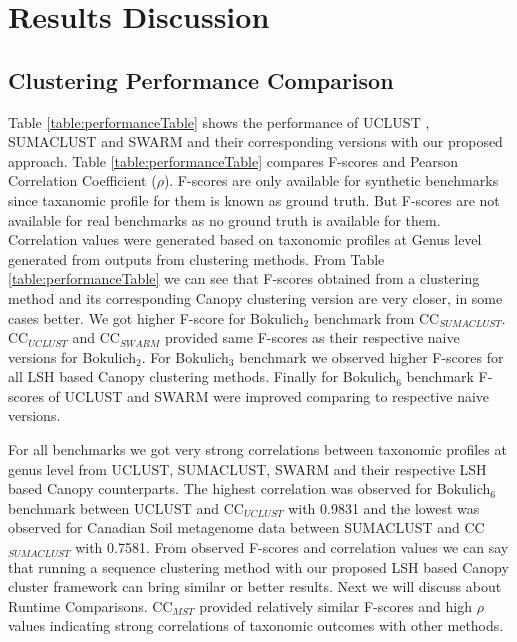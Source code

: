 \documentclass[10pt, conference, compsocconf]{IEEEtran}
\begin{document}
\section{Results Discussion} 
\label{sec:results}

\subsection{\textbf{Clustering Performance Comparison}}
Table \ref{table:performanceTable} shows the performance of  UCLUST \cite{MARuclust}, 
SUMACLUST \cite{MARSumaclust} and SWARM \cite{MARSwarm} and their corresponding versions with our proposed approach. Table \ref{table:performanceTable} compares F-scores and Pearson Correlation Coefficient ($\rho$). F-scores are only available for synthetic benchmarks since taxanomic profile for them is known as ground truth. But F-scores are not available for real benchmarks as no ground truth is available for them. Correlation values were generated based on taxonomic profiles at Genus level generated from outputs from clustering methods. From Table \ref{table:performanceTable} we can see that F-scores obtained from a clustering method and its corresponding Canopy clustering version are very closer, in some cases better. We got higher F-score for Bokulich$_2$ benchmark from CC$_{SUMACLUST}$. CC$_{UCLUST}$ and CC$_{SWARM}$ provided same F-scores as their respective naive versions for Bokulich$_2$. For Bokulich$_3$ benchmark we observed higher F-scores for all LSH based Canopy clustering methods. Finally for Bokulich$_6$ benchmark F-scores of UCLUST and SWARM were improved comparing to respective naive versions.

For all benchmarks we got very strong correlations between taxonomic profiles at genus level from UCLUST, SUMACLUST, SWARM and their respective LSH based Canopy counterparts. The highest correlation was observed for Bokulich$_6$ benchmark between UCLUST and CC$_{UCLUST}$ with 0.9831 and the lowest was observed for Canadian Soil metagenome data between SUMACLUST and CC$_{SUMACLUST}$ with 0.7581. From observed F-scores and correlation values we can say that running a sequence clustering method with our proposed LSH based Canopy cluster framework can bring similar or better results. Next we will discuss about Runtime Comparisons. CC$_{MST}$ provided relatively similar F-scores and high $\rho$ values indicating strong correlations of taxonomic outcomes with other methods. 
\end{document}
